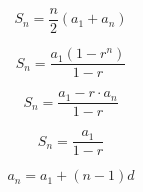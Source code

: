 






\[\begin{equation} \label{Arithmetic Sum for Finite} S_{n}=\frac{n}{2}(a_{1}+a_{n}) \end{equation}\]

\[\begin{equation} \label{Geometric Sum of a Finite} S_{n}=\frac{a_{1}(1-r^{n})}{1-r} \end{equation}\]

\[\begin{equation} \label{Geometric Sum of a Finite} S_{n}=\frac{a_{1}-r\cdot a_{n}}{1-r} \end{equation}\]

\[\begin{equation} \label{Geometric Sum of an Infinte} S_{n}=\frac{a_{1}}{1-r} \end{equation}\]

\[\begin{equation} \label{Arithmetic Formula with a1} a_{n}=a_{1}+(n-1)d \end{equation}\]

